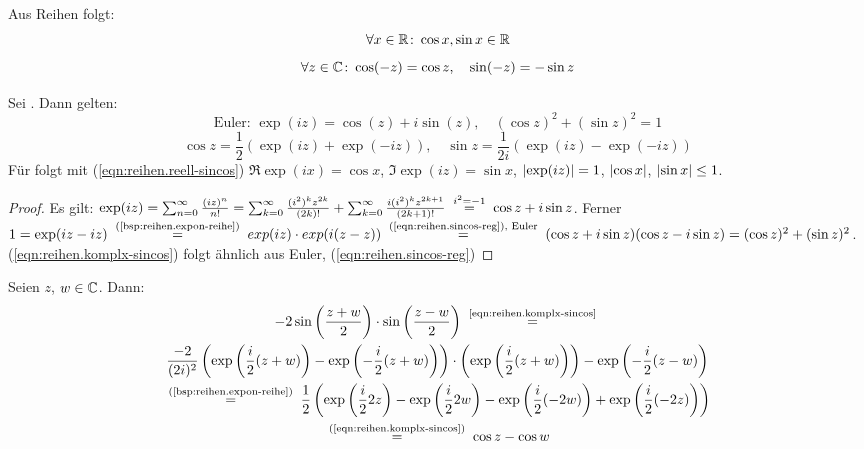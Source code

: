 \documentclass[12pt]{scrreprt}
\begin{document}
\noindent Aus Reihen folgt:
\begin{equation}\label{eqn:reihen.reell-sincos}
\forall x\in\mathbb{R}\colon \cos x, \sin x \in\mathbb{R}
\end{equation}
\begin{equation}\label{eqn:reihen.sincos-reg}
\forall z\in\mathbb{C}\colon \cos(-z) = \cos z,\quad \sin(-z) = -\sin z
\end{equation}

\begin{satz}\label{satz:reihen.euler}
Sei . Dann gelten:
\[\text{Euler: }\exp(iz) = \cos(z) + i\sin(z), \quad (\cos z)^2 + (\sin z)^2 = 1\] %
\begin{equation}\label{eqn:reihen.komplx-sincos}
\cos z = \frac{1}{2}(\exp(iz) + \exp(-iz)),\quad \sin z = \frac{1}{2i}(\exp(iz) - \exp(-iz))
\end{equation}
Für  folgt mit (\ref{eqn:reihen.reell-sincos}) $\Re \exp(ix) = \cos x$, $\Im \exp(iz) = \sin x$, 
$\left\lvert\exp(iz)\right\lvert = 1$, $\left\lvert\cos x\right\lvert$, $\left\lvert\sin x\right\lvert \le 1$.
\end{satz}
\begin{proof}
Es gilt: $\exp(iz) = \sum_{n=0}^\infty \frac{(iz)^n}{n!} = \reihe{\frac{(i^2)^kz^{2k}}{(2k)!}} + \reihe{\frac{i(i^2)^kz^{2k+1}}{(2k+1)!}} \wegen{=}{i^2 = -1} \cos z + i\sin z$.
Ferner $1= \exp(iz - iz) \nach{=}{(\ref{bsp:reihen.expon-reihe})} exp(iz) \cdot exp(i(z-z)) \nach{=}{(\ref{eqn:reihen.sincos-reg}), Euler} (\cos z + i\sin z)(\cos z - i\sin z) = (\cos z)^2 + (\sin z)^2$. 
(\ref{eqn:reihen.komplx-sincos}) folgt ähnlich aus Euler, (\ref{eqn:reihen.sincos-reg})
\end{proof}

\begin{kor}\label{kor:reihen.sin-nach-cos}
Seien $z$, $w\in\mathbb{C}$. Dann:
\begin{multline*}
-2\sin\left(\frac{z+w}{2}\right)\cdot\sin\left(\frac{z-w}{2}\right) \nach{=}{\ref{eqn:reihen.komplx-sincos}} \\
\frac{-2}{(2i)^2}\left(\exp\left(\frac{i}{2}(z+w)\right)-\exp\left(-\frac{i}{2}(z+w)\right)\right)\cdot \left(\exp\left(\frac{i}{2}(z+w)\right)\right) - \exp\left(-\frac{i}{2}(z-w)\right)\\
\nach{=}{(\ref{bsp:reihen.expon-reihe})} \frac{1}{2}\left(\exp\left(\frac{i}{2} 2z\right)-\exp\left(\frac{i}{2}2w\right) - \exp\left(\frac{i}{2}(-2w)\right) + \exp\left(\frac{i}{2}(-2z)\right)\right)\\
\nach{=}{(\ref{eqn:reihen.komplx-sincos})} \cos z - \cos w
\end{multline*}
\end{kor}
\end{document}
